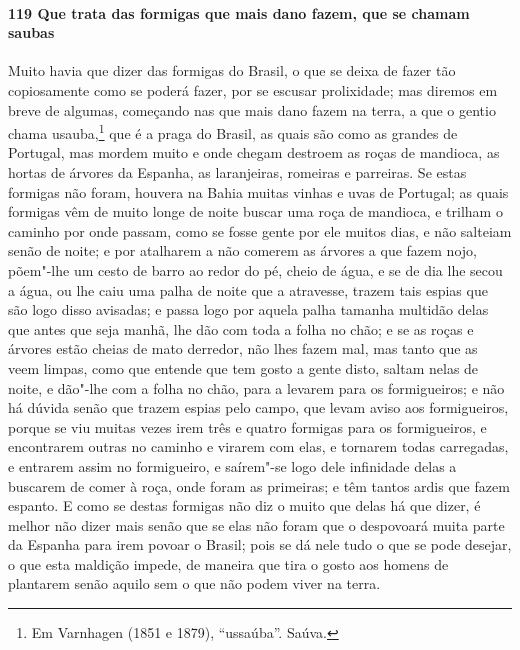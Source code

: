 \begin{linenumbers}
\paragraph{119 Que trata das formigas que mais dano fazem, que se chamam saubas}\quad
Muito havia que dizer das formigas do Brasil, o que se deixa de fazer tão copiosamente
como se poderá fazer, por se escusar prolixidade; mas diremos em breve de algumas,
começando nas que mais dano fazem na terra, a que o gentio chama usauba,\footnote{ Em
Varnhagen (1851 e 1879), ``ussaúba''. Saúva.} que é a praga do Brasil, as quais são como
as grandes de Portugal, mas mordem muito e onde chegam destroem as roças de mandioca, as
hortas de árvores da Espanha, as laranjeiras, romeiras e parreiras. Se estas formigas não
foram, houvera na Bahia muitas vinhas e uvas de Portugal; as quais formigas vêm de muito
longe de noite buscar uma roça de mandioca, e trilham o caminho por onde passam, como se
fosse gente por ele muitos dias, e não salteiam senão de noite; e por atalharem a não
comerem as árvores a que fazem nojo, põem"-lhe um cesto de barro ao redor do pé, cheio de
água, e se de dia lhe secou a água, ou lhe caiu uma palha de noite que a atravesse, trazem
tais espias que são logo disso avisadas; e passa logo por aquela palha tamanha multidão
delas que antes que seja manhã, lhe dão com toda a folha no chão; e se as roças e árvores
estão cheias de mato derredor, não lhes fazem mal, mas tanto que as veem limpas, como que
entende que tem gosto a gente disto, saltam nelas de noite, e dão"-lhe com a folha no chão,
para a levarem para os formigueiros; e não há dúvida senão que trazem espias pelo campo,
que levam aviso aos formigueiros, porque se viu muitas vezes irem três e quatro formigas
para os formigueiros, e encontrarem outras no caminho e virarem com elas, e tornarem todas
carregadas, e entrarem assim no formigueiro, e saírem"-se logo dele infinidade delas a
buscarem de comer à roça, onde foram as primeiras; e têm tantos ardis que fazem espanto. E
como se destas formigas não diz o muito que delas há que dizer, é melhor não dizer mais
senão que se elas não foram que o despovoará muita parte da Espanha para irem povoar o
Brasil; pois se dá nele tudo o que se pode desejar, o que esta maldição impede, de maneira
que tira o gosto aos homens de plantarem senão aquilo sem o que não podem viver na terra.


\end{linenumbers}
